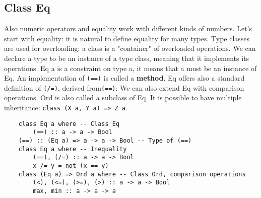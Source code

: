 \subsection{Class Eq}
Also numeric operators and equality work with different kinds of numbers.
Let's start with equality: it is natural to define equality for many types.
Type classes are used for overloading: a class is a "container" of overloaded operations.
We can declare a type to be an instance of a type class, meaning that it implements its operations.
Eq a is a constraint on type a, it means that a must be an instance of Eq.
An implementation of \texttt{(==)} is called a \textbf{method}.
Eq offers also a standard definition of \texttt{(/=)}, derived from\texttt{(==)}:
We can also extend Eq with comparison operations.
Ord is also called a subclass of Eq.
It is possible to have multiple inheritance: \texttt{class (X a, Y a) => Z a}.
\begin{lstlisting}
	class Eq a where -- Class Eq
		(==) :: a -> a -> Bool
	(==) :: (Eq a) => a -> a -> Bool -- Type of (==)
	class Eq a where -- Inequality
		(==), (/=) :: a -> a -> Bool
		x /= y = not (x == y)
	class (Eq a) => Ord a where -- Class Ord, comparison operations
		(<), (<=), (>=), (>) :: a -> a -> Bool
		max, min :: a -> a -> a
\end{lstlisting}

